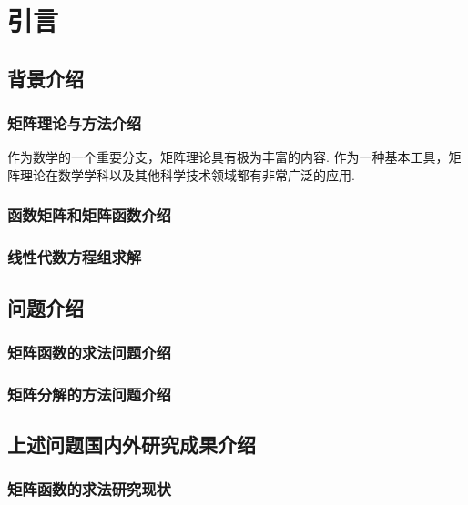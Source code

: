 \section{引言}
\fontsize{12pt}{14pt}\selectfont
\songti
    \subsection{背景介绍}
        \subsubsection{矩阵理论与方法介绍}
            \par 作为数学的一个重要分支，矩阵理论具有极为丰富的内容. 作为一种基本工具，矩阵理论在数学学科以及其他科学技术领域都有非常广泛的应用.
            \par 

        \subsubsection{函数矩阵和矩阵函数介绍}



        \subsubsection{线性代数方程组求解}


        
    \subsection{问题介绍}
        \subsubsection{矩阵函数的求法问题介绍}

        

        \subsubsection{矩阵分解的方法问题介绍}




    \subsection{上述问题国内外研究成果介绍}
        \subsubsection{矩阵函数的求法研究现状}



